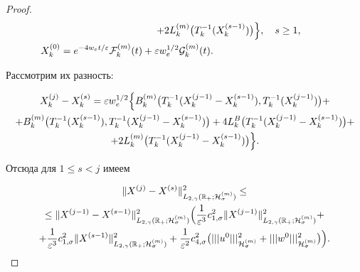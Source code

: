 \begin{proof}
\begin{gather*}
\;

\hspace{3cm}

+2L^{(m)}_k\bigl(T^{-1}_k(X^{(s-1)}_k)\bigr)\Bigr\},\quad s\ge1,

\\

X^{(0)}_k=e^{-4w_e t/ \varepsilon} {\cal F}^{(m)}_k(t)

+\varepsilon w_e^{1/2}{\cal G}^{(m)}_k(t).  \hspace{4cm} \;

\end{gather*}

Рассмотрим их разность:

\begin{multline*}

X^{(j)}_k-X^{(s)}_k=\varepsilon w_e^{1/2}\Bigl\{ 

B^{(m)}_k \bigl(T^{-1}_k(X^{(j-1)}_k-X^{(s-1)}_k),  T^{-1}_k(X^{(j-1)}_k)\bigr)+

\\

+B^{(m)}_k \bigl(T^{-1}_k(X^{(s-1)}_k),  T^{-1}_k(X^{(j-1)}_k-X^{(s-1)}_k)\bigr) +4 L_k^B \bigl(T^{-1}_k(X^{(j-1)}_k-X^{(s-1)}_k)\bigr)+ \\

+2L^{(m)}_k \bigl(T^{-1}_k(X^{(j-1)}_k-X^{(s-1)}_k)\bigr)\Bigr\}.

\end{multline*}

Отсюда для $1\le s<j$ имеем

\begin{multline*}

\|X^{(j)}-X^{(s)}\|^2_{L_{2,\gamma}(\mathbb R_{+};{\cal H}^{(m)}_{\sigma})}\le

\\ 

\le 

\|X^{(j-1)}-X^{(s-1)}\|^2_{L_{2,\gamma}(\mathbb R_{+};{\cal H}^{(m)}_{\sigma})}

\Bigl(\frac{1}{\varepsilon^3}c^2_{1,\sigma}

\|X^{(j-1)}\|^2_{L_{2,\gamma}(\mathbb R_{+};{\cal H}^{(m)}_{\sigma})}+

\\

+\frac{1}{\varepsilon^3}c^2_{1,\sigma}\|X^{(s-1)}\|^2_{L_{2,\gamma}(\mathbb R_{+};{\cal H}^{(m)}_{\sigma})}+

\frac{1}{\varepsilon^2}c^2_{4,\sigma}

\bigl(|||u^0|||^2_{{\cal H}^{(m)}_\sigma}+|||w^0|||^2_{{\cal H}^{(m)}_\sigma}\bigr)\Bigr).


\end{multline*}
\end{proof}
